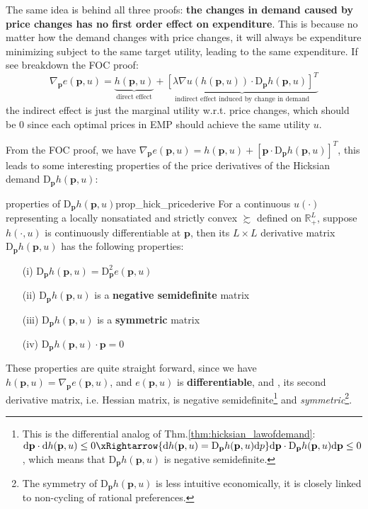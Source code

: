 The same idea is behind all three proofs: \textbf{the changes in demand caused by price changes has no first order effect on expenditure}. This is because no matter how the demand changes with price changes, it will always be expenditure minimizing subject to the same target utility, leading to the same expenditure.
If see breakdown the FOC proof:
$$ \nabla_{\mathbf{p}}e(\mathbf{p},u) = \underbrace{h(\mathbf{p},u)}_{\text{direct effect}} + \underbrace{\left[\lambda\nabla u(h(\mathbf{p},u))\cdot \mathrm{D}_{\mathbf{p}}h(\mathbf{p},u)\right]^T}_{\text{indirect effect induced by change in demand}}$$
the indirect effect is just the marginal utility w.r.t. price changes, which should be 0 since each optimal prices in EMP should achieve the same utility $u$.

From the FOC proof, we have $\nabla_{\mathbf{p}}e(\mathbf{p},u)=h(\mathbf{p},u)+\left[\mathbf{p}\cdot \mathrm{D}_{\mathbf{p}}h(\mathbf{p},u)\right]^T$, this leads to some interesting properties of the price derivatives of the Hicksian demand $\mathrm{D}_{\mathbf{p}}h(\mathbf{p},u)$:
\begin{theorem}{properties of $\mathrm{D}_{\mathbf{p}}h(\mathbf{p},u)$}{prop_hick_pricederive}
    For a continuous $u(\cdot)$ representing a locally nonsatiated and strictly convex $\succsim$ defined on $\mathbb{R}^L_{+}$, suppose $h(\cdot,u)$ is continuously differentiable at $\mathbf{p}$, then its $L\times L$ derivative matrix $\mathrm{D}_{\mathbf{p}}h(\mathbf{p},u)$ has the following properties:
    \begin{itemize}
        \item[(i)] $\mathrm{D}_{\mathbf{p}}h(\mathbf{p},u)=\mathrm{D}^2_{\mathbf{p}}e(\mathbf{p},u)$
        \item[(ii)] $\mathrm{D}_{\mathbf{p}}h(\mathbf{p},u)$ is a \textbf{negative semidefinite} matrix
        \item[(iii)] $\mathrm{D}_{\mathbf{p}}h(\mathbf{p},u)$ is a \textbf{symmetric} matrix
        \item[(iv)]  $\mathrm{D}_{\mathbf{p}}h(\mathbf{p},u)\cdot \mathbf{p}=0$
    \end{itemize}
\end{theorem}
These properties are quite straight forward, since we have $h(\mathbf{p},u)=\nabla_{\mathbf{p}}e(\mathbf{p},u)$, and $e(\mathbf{p},u)$ is  \textbf{differentiable}, and , its second derivative matrix, i.e. Hessian matrix, 
is negative semidefinite\footnote{This is the differential analog of Thm.\ref{thm:hicksian_lawofdemand}: $\mathrm{d}\mathbf{p}\cdot \mathrm{d}h(\mathbf{p},u)\leq 0 \xRightarrow{\mathrm{d}h(\mathbf{p},u)=\mathrm{D}_{\mathbf{p}}h(\mathbf{p},u)\mathrm{d}p} \mathrm{d}\mathbf{p}\cdot \mathrm{D}_{\mathbf{p}}h(\mathbf{p},u)\mathrm{d}\mathbf{p}\leq 0$, which means that $\mathrm{D}_{\mathbf{p}}h(\mathbf{p},u)$ is negative semidefinite.} 
and \textit{symmetric}\footnote{The symmetry of $\mathrm{D}_{\mathbf{p}}h(\mathbf{p},u)$ is less intuitive economically, it is closely linked to non-cycling of rational preferences.}.

